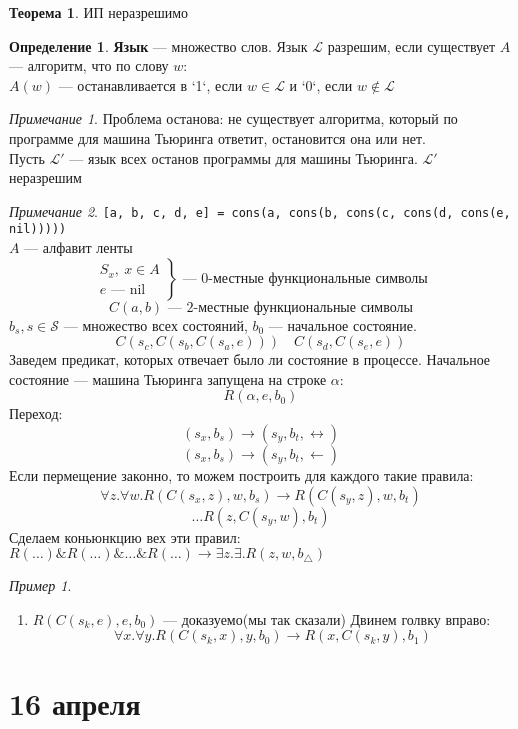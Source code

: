 \documentclass[oneside]{book}
\newcommand{\fixme}{{\color{red}\fbox{\text{Исправить}}}}
\theoremstyle{plain}
\theoremstyle{remark}
\newtheorem*{remark}{Примечание}
\newtheorem*{examp}{Пример}
\theoremstyle{definition}
\newtheorem{theorem}{Теорема}[section]
\newtheorem*{definition}{Определение}
\begin{document}
\begin{theorem}
ИП неразрешимо
\end{theorem}
\begin{definition}
\textbf{Язык} --- множество слов. Язык \(\mathcal{L}\) разрешим, если существует \(A\) --- алгоритм, что по слову \(w\): \\
\(A(w)\) --- останавливается в `1`, если \(w \in \mathcal{L}\) и `0`, если \(w \not\in \mathcal{L}\)
\end{definition}
\begin{remark}
Проблема останова: не существует алгоритма, который по программе для машина Тьюринга ответит, остановится она или нет. \\
Пусть \(\mathcal{L}'\) --- язык всех останов программы для машины Тьюринга. \(\mathcal{L}'\) неразрешим
\end{remark}
\begin{remark}
\texttt{[a, b, c, d, e] = cons(a, cons(b, cons(c, cons(d, cons(e, nil)))))} \\
\(A\) --- алфавит ленты
\[ \left.\begin{array}{l}
S_x,\ x \in A \\
e \text{ --- } \text{nil}
\end{array}\right\} \text{ --- } 0\text{-местные функциональные символы}\]
\[ C(a, b) \text{ --- } 2\text{-местные функциональные символы} \]
\(b_s, s \in \mathcal{S}\) --- множество всех состояний, \(b_0\) --- начальное состояние.
\[ C(s_c, C(s_b, C(s_a, e))) \quad C(s_d, C(s_e, e)) \]
Заведем предикат, которых отвечает было ли состояние в процессе. Начальное состояние --- машина Тьюринга запущена на строке \(\alpha\):
\[ R(\alpha, e, b_0) \]
Переход:
\[ (s_x, b_s) \to (s_y, b_t, \leftrightarrow) \]
\[ (s_x, b_s) \to (s_y, b_t, \leftarrow) \]
Если пермещение законно, то можем построить для каждого такие правила:
\[ \forall z. \forall w. R(C(s_x, z), w, b_s) \to R(C(s_y, z), w, b_t) \]
\[ \dots  R(z, C(s_y, w), b_t)\]
Сделаем коньюнкцию вех эти правил: \(R(\dots)\&R(\dots)\&\dots\&R(\dots) \to \exists z. \exists . R(z, w, b_\triangle)\)
\fixme
\end{remark}
\begin{examp}
\-
\begin{enumerate}
\item \(R(C(s_k, e), e, b_0)\) --- доказуемо(мы так сказали)
Двинем голвку вправо:
\[ \forall x. \forall y. R(C(s_k, x), y, b_0) \to R(x, C(s_k, y), b_1) \]
\end{enumerate}
\end{examp}
\chapter{16 апреля}
\label{sec:org1b900ae}
\end{document}
